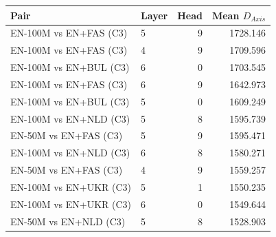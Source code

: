 \begin{tabular}{@{}llrr@{}}
\toprule
Pair & Layer & Head & Mean $D_{Axis}$ \\
\midrule
EN-100M vs EN+FAS (C3) & 5 & 9 & 1728.146 \\
EN-100M vs EN+FAS (C3) & 4 & 9 & 1709.596 \\
EN-100M vs EN+BUL (C3) & 6 & 0 & 1703.545 \\
EN-100M vs EN+FAS (C3) & 6 & 9 & 1642.973 \\
EN-100M vs EN+BUL (C3) & 5 & 0 & 1609.249 \\
EN-100M vs EN+NLD (C3) & 5 & 8 & 1595.739 \\
EN-50M vs EN+FAS (C3) & 5 & 9 & 1595.471 \\
EN-100M vs EN+NLD (C3) & 6 & 8 & 1580.271 \\
EN-50M vs EN+FAS (C3) & 4 & 9 & 1559.257 \\
EN-100M vs EN+UKR (C3) & 5 & 1 & 1550.235 \\
EN-100M vs EN+UKR (C3) & 6 & 0 & 1549.644 \\
EN-50M vs EN+NLD (C3) & 5 & 8 & 1528.903 \\
\bottomrule
\end{tabular}
